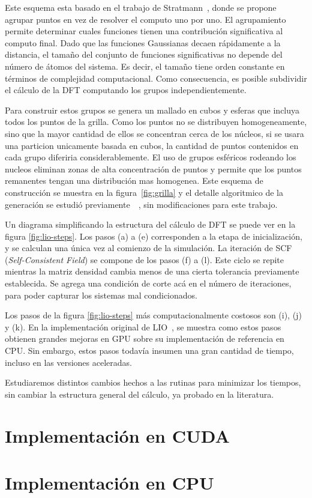 Este esquema esta basado en el trabajo de Stratmann~\cite{Stratmann}, donde se propone
agrupar puntos en vez de resolver el computo uno por uno. El agrupamiento permite determinar
cuales funciones tienen una contribuci\'on significativa al computo final. Dado que las
funciones Gaussianas decaen r\'apidamente a la distancia, el tama\~no del conjunto de
funciones significativas no depende del n\'umero de \'atomos del sistema. Es decir, el tama\~no
tiene orden constante en t\'erminos de complejidad computacional. Como consecuencia, es posible
subdividir el c\'alculo de la DFT computando los grupos independientemente.

Para construir estos grupos se genera un mallado en cubos y esferas que incluya todos los puntos
de la grilla. Como los puntos no se distribuyen homogeneamente, sino que la mayor cantidad de ellos
se concentran cerca de los núcleos, si se usara una particion unicamente basada en cubos, la cantidad
de puntos contenidos en cada grupo diferiria considerablemente. El uso de grupos esféricos rodeando
los nucleos eliminan zonas de alta concentraci\'on de puntos y permite que los puntos remanentes
tengan una distribuci\'on mas homogenea. Este esquema de construcci\'on se muestra en la figura~\ref{fig:grilla}
y el detalle algoritmico de la generaci\'on se estudi\'o previamente~\cite{LIO}~\cite{TesisNitsche},
sin modificaciones para este trabajo.

Un diagrama simplificando la estructura del c\'alculo de DFT se puede ver en la figura \ref{fig:lio-steps}.
Los pasos (a) a (e) corresponden a la etapa de inicializaci\'on, y se calculan una \'unica vez
al comienzo de la simulaci\'on. La iteraci\'on de SCF (\textit{Self-Consistent Field}) se
compone de los pasos (f) a (l). Este ciclo se repite mientras la matriz densidad cambia
menos de una cierta tolerancia previamente establecida. Se agrega una condici\'on de corte ac\'a
en el n\'umero de iteraciones, para poder capturar los sistemas mal condicionados.~\cite{LIO}

Los pasos de la figura \ref{fig:lio-steps} m\'as computacionalmente costosos son (i), (j) y (k).
En la implementaci\'on original de LIO~\cite{TesisNitsche}, se muestra como estos pasos
obtienen grandes mejoras en GPU sobre su implementaci\'on de referencia en CPU. Sin embargo,
estos pasos todav\'ia insumen una gran cantidad de tiempo, incluso en las versiones aceleradas.

Estudiaremos distintos cambios hechos a las rutinas para minimizar los tiempos,
sin cambiar la estructura general del c\'alculo, ya probado en la literatura.

\section{Implementaci\'on en CUDA}



\section{Implementaci\'on en CPU}


